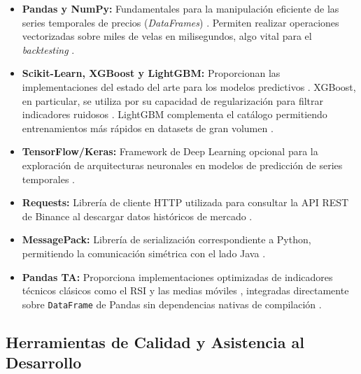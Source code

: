 \begin{itemize}
    \item \textbf{Pandas y NumPy:} Fundamentales para la manipulación eficiente 
    de las series temporales de precios (\textit{DataFrames}) 
    \parencite{mckinney_python_2022}. Permiten realizar operaciones vectorizadas 
    sobre miles de velas en milisegundos, algo vital para el \textit{backtesting} 
    \parencite{treleaven_algorithmic_2013}.

    \item \textbf{Scikit-Learn, XGBoost y LightGBM:} Proporcionan las 
    implementaciones del estado del arte para los modelos predictivos 
    \parencite{pedregosa_scikit_2011}. XGBoost, en particular, se utiliza por 
    su capacidad de regularización para filtrar indicadores ruidosos 
    \parencite{chen_xgboost_2016}. LightGBM complementa el catálogo permitiendo 
    entrenamientos más rápidos en datasets de gran volumen 
    \parencite{ke_lightgbm_2017}.

    \item \textbf{TensorFlow/Keras:} Framework de Deep Learning opcional para 
    la exploración de arquitecturas neuronales en modelos de predicción de series 
    temporales \parencite{goodfellow_deep_2016}.

    \item \textbf{Requests:} Librería de cliente HTTP utilizada para consultar 
    la API REST de Binance al descargar datos históricos de mercado 
    \parencite{binance_rest_api_2024,requests_python_2024}.

    \item \textbf{MessagePack:} Librería de serialización correspondiente a 
    Python, permitiendo la comunicación simétrica con el lado Java 
    \parencite{furuhashi_msgpack_2013}.

    \item \textbf{Pandas TA:} Proporciona implementaciones optimizadas de 
    indicadores técnicos clásicos como el RSI y las medias móviles 
    \parencite{murphy_technical_1999}, integradas directamente sobre 
    \texttt{DataFrame} de Pandas \parencite{mckinney_python_2022} sin 
    dependencias nativas de compilación \parencite{pandas_ta_2024}.

\end{itemize}

\subsection{Herramientas de Calidad y Asistencia al Desarrollo}

